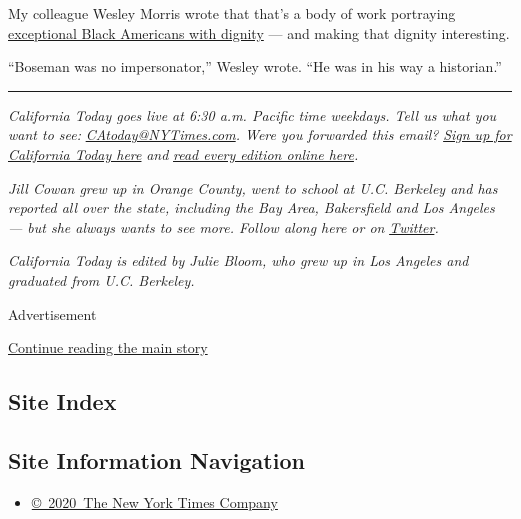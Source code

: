 My colleague Wesley Morris wrote that that's a body of work portraying
\href{https://www.nytimes3xbfgragh.onion/2020/08/29/movies/chadwick-boseman-appraisal.html}{exceptional
Black Americans with dignity} --- and making that dignity interesting.

``Boseman was no impersonator,'' Wesley wrote. ``He was in his way a
historian.''

\begin{center}\rule{0.5\linewidth}{\linethickness}\end{center}

\emph{California Today goes live at 6:30 a.m. Pacific time weekdays.
Tell us what you want to see:}
\href{mailto:CAtoday@NYTimes.com}{\emph{CAtoday@NYTimes.com}}\emph{.
Were you forwarded this email?}
\href{https://www.nytimes3xbfgragh.onion/newsletters/california-today?module=inline}{\emph{Sign
up for California Today here}} \emph{and}
\href{https://www.nytimes3xbfgragh.onion/column/california-today}{\emph{read
every edition online here}}\emph{.}

\emph{Jill Cowan grew up in Orange County, went to school at U.C.
Berkeley and has reported all over the state, including the Bay Area,
Bakersfield and Los Angeles --- but she always wants to see more. Follow
along here or on}
\href{https://twitter.com/JillCowan}{\emph{Twitter}}\emph{.}

\emph{California Today is edited by Julie Bloom, who grew up in Los
Angeles and graduated from U.C. Berkeley.}

Advertisement

\protect\hyperlink{after-bottom}{Continue reading the main story}

\hypertarget{site-index}{%
\subsection{Site Index}\label{site-index}}

\hypertarget{site-information-navigation}{%
\subsection{Site Information
Navigation}\label{site-information-navigation}}

\begin{itemize}
\tightlist
\item
  \href{https://help.nytimes3xbfgragh.onion/hc/en-us/articles/115014792127-Copyright-notice}{©~2020~The
  New York Times Company}
\end{itemize}

